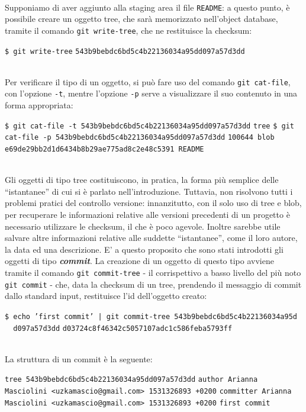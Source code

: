 \documentclass[12pt]{article}
\def\code#1{\texttt{#1}}
\def\quote#1{``#1''}
\begin{document}
\bigskip \\
Supponiamo di aver aggiunto alla staging area il file \code{README}: a questo punto, è possibile creare un oggetto tree, che sarà memorizzato nell'object database, tramite il comando \code{git write-tree}, che ne restituisce la checksum:
\begin{algorithm*}
	\begin{algorithmic}
		\State \code{\$ git write-tree}
		\State \code{543b9bebdc6bd5c4b22136034a95dd097a57d3dd}	
	\end{algorithmic}
\end{algorithm*}
\ \\Per verificare il tipo di un oggetto, si può fare uso del comando \code{git cat-file}, con l'opzione \code{-t}, mentre l'opzione \code{-p} serve a visualizzare il suo contenuto in una forma appropriata:
\begin{algorithm*}
	\begin{algorithmic}
		\State \code{\$ git cat-file -t 543b9bebdc6bd5c4b22136034a95dd097a57d3dd}
		\State \code{tree}
		\State \code{\$ git cat-file -p 543b9bebdc6bd5c4b22136034a95dd097a57d3dd}
		\State \code{100644 blob e69de29bb2d1d6434b8b29ae775ad8c2e48c5391 README}
	\end{algorithmic}
\end{algorithm*}
\ \\ 
Gli oggetti di tipo tree costituiscono, in pratica, la forma più semplice delle \quote{istantanee} di cui si è parlato nell'introduzione. Tuttavia, non risolvono tutti i problemi pratici del controllo versione: innanzitutto, con il solo uso di tree e blob, per recuperare le informazioni relative alle versioni precedenti di un progetto è necessario utilizzare le checksum, il che è poco agevole. Inoltre sarebbe utile salvare altre informazioni relative alle suddette \quote{istantanee}, come il loro autore, la data ed una descrizione. E' a questo proposito che sono stati introdotti gli oggetti di tipo \textit{\textbf{commit}}.
La creazione di un oggetto di questo tipo avviene tramite il comando \code{git commit-tree} - il corrispettivo a basso livello del più noto \code{git commit} - che, data la checksum di un tree, prendendo il messaggio di commit dallo standard input, restituisce l'id dell'oggetto creato:
\begin{algorithm*}[H]
	\begin{algorithmic}
		\State \code{\$ echo 'first commit' | git commit-tree 543b9bebdc6bd5c4b22136034a95d\\ \ \ d097a57d3dd}
		\State \code{d03724c8f46342c5057107adc1c586feba5793ff}
	\end{algorithmic}
\end{algorithm*}
\ \\ 
La struttura di un commit è la seguente:
\begin{algorithm*}
	\begin{algorithmic}
		\State \code{tree 543b9bebdc6bd5c4b22136034a95dd097a57d3dd}
		\State \code{author Arianna Masciolini <uzkamascio@gmail.com> 1531326893 +0200}
		\State \code{committer Arianna Masciolini <uzkamascio@gmail.com> 1531326893 +0200}
		\State 
		\State \code{first commit}
	\end{algorithmic}
\end{algorithm*}
\end{document}
